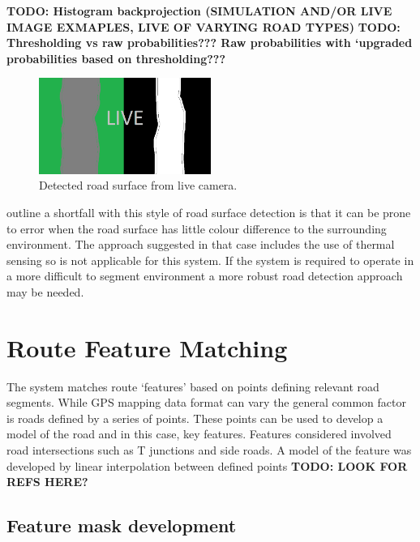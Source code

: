 \documentclass[]{aiaa-tc}%
\begin{document}
\textbf{TODO: Histogram backprojection (SIMULATION AND/OR LIVE IMAGE EXMAPLES, LIVE OF VARYING ROAD TYPES)}
\textbf{TODO: Thresholding vs raw probabilities??? Raw probabilities with `upgraded probabilities based on thresholding???}


\begin{figure}
	\includegraphics[width=0.5\textwidth]{RoadDetection/histRoadLive.png}
	\caption{Detected road surface from live camera.}
	\label{f:histRoadLive}
\end{figure}

\citet{histBackRefineShadows} outline a shortfall with this style of road surface detection is that it can be prone to error when the road surface has little colour difference to the surrounding environment. The approach suggested in that case includes the use of thermal sensing so is not applicable for this system. If the system is required to operate in a more difficult to segment environment a more robust road detection approach may be needed. 


\section{Route Feature Matching}\label{sect:route_feature_matching}

The system matches route `features' based on points defining relevant road segments. While GPS mapping data format can vary the general common factor is roads defined by a series of points. These points can be used to develop a model of the road and in this case, key features. Features considered involved road intersections such as T junctions and side roads. A model of the feature was developed by linear interpolation between defined points
\textbf{TODO: LOOK FOR REFS HERE?}
\subsection{Feature mask development}
\end{document}
